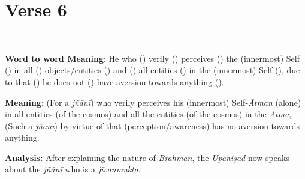\chapter{Verse 6}

\begin{moolashloka}
\\
\end{moolashloka}

\textbf{Word to word Meaning}: He who () verily () perceives () the (innermost) Self () in all () objects/entities () and () all entities () in the (innermost) Self (), due to that () he does not () have aversion towards anything ().

\textbf{Meaning}: (For a \emph{jñānī}) who verily perceives his (innermost) Self-\emph{Ātman} (alone) in all entities (of the cosmos) and all the entities (of the cosmos) in the \emph{Ātma}, (Such a \emph{jñānī}) by virtue of that (perception/awareness) has no aversion towards anything.

\textbf{Analysis:} After explaining the nature of \emph{Brahman}, the \emph{Upaniṣad} now speaks about the \emph{jñānī} who is a \emph{jīvanmukta}.

